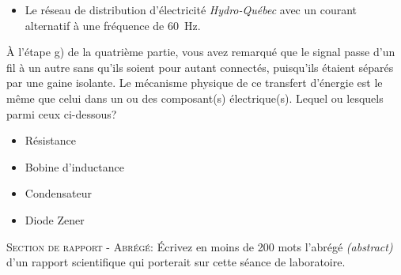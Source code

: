 \documentclass[canadien,12pt,oneside,letterpaper]{article}
\begin{document}
\begin{gradescope}
\begin{gradescope}
\begin{itemize}[label=$\blacktriangleright$]
            \item Le réseau de distribution d'électricité \textit{Hydro-Québec} avec un courant alternatif à une fréquence de \qty{60}{\Hz}.
        	\end{itemize}
        \item À l'étape g) de la quatrième partie, vous avez remarqué que le signal passe d'un fil à un autre sans qu'ils soient pour autant connectés, puisqu'ils étaient séparés par une gaine isolante. Le mécanisme physique de ce transfert d'énergie est le même que celui dans un ou des composant(s) électrique(s). Lequel ou lesquels parmi ceux ci-dessous?
        \begin{itemize}[label=$\blacktriangleright$]
        \item Résistance
        \item Bobine d'inductance
        \item Condensateur
        \item Diode Zener
        \end{itemize}
    \end{gradescope}
    \item \textsc{Section de rapport - Abrégé:} Écrivez en moins de 200 mots l'abrégé \textit{(abstract)} d'un rapport scientifique qui porterait sur cette séance de laboratoire.
\end{gradescope}
\end{document}
